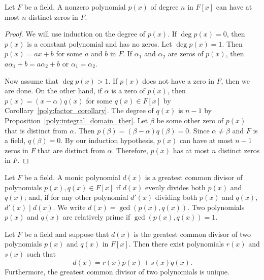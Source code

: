  
\begin{corollary}\label{poly:zeros_corollary}
Let $F$ be a field. A nonzero polynomial $p(x)$ of degree $n$ in
$F[x]$ can have at most $n$ distinct zeros in $F$.  
\end{corollary}
 
 
\begin{proof}
We will use induction on the degree of $p(x)$. If $\deg p(x) = 0$,
then $p(x)$ is a constant polynomial and has no zeros.  Let $\deg p(x)
= 1$. Then $p(x) = ax +b$ for some $a$ and $b$ in $F$. If $\alpha_1$ and
$\alpha_2$ are zeros of $p(x)$, then $a\alpha_1 + b = a\alpha_2 +b$ or
$\alpha_1 = \alpha_2$. 
 
Now assume that $\deg p(x) > 1$. If $p(x)$ does not have a zero in
$F$, then we are done.  On the other hand, if $\alpha$ is a zero of
$p(x)$, then $p(x) = (x - \alpha ) q(x)$ for some $q(x) \in F[x]$ by
Corollary~\ref{poly:factor_corollary}. The degree of $q(x)$ is $n-1$ by Proposition~\ref{poly:integral_domain_ther}.
Let $\beta$ be some other zero of $p(x)$ that is distinct from
$\alpha$. Then $p(\beta) = (\beta - \alpha) q(\beta) = 0$. Since
$\alpha \neq \beta$ and $F$ is a field, $q(\beta ) = 0$. By our
induction hypothesis, $p(x)$ can have at most $n -1$ zeros in $F$ that
are distinct from $\alpha$. Therefore, $p(x)$ has at most $n$ distinct
zeros in $F$.
\end{proof}
 
 
\medskip
 
 
Let $F$ be a field.  A monic polynomial $d(x)$ is a {\bfi greatest
common divisor\/} of polynomials 
$p(x), q(x) \in F[x]$ if $d(x)$ evenly divides both $p(x)$ and $q(x)$;
and, if for any other polynomial $d'(x)$ dividing both $p(x)$ and
$q(x)$,  $d'(x) \mid d(x)$.  We write $d(x) = \gcd( p(x), q( x))$. Two
polynomials $p(x)$ and $q(x)$ are {\bfi relatively prime\/} if $\gcd(
p(x), q(x) ) = 1$. 
 
 
\begin{proposition}\label{poly:gcd_ther}
Let $F$ be a field and suppose that $d(x)$ is the greatest common
divisor of two polynomials $p(x)$ and $q(x)$ in $F[x]$. Then there
exist polynomials $r(x)$ and $s(x)$ such that
\[
d(x) = r(x) p(x) + s(x) q(x).
\]
Furthermore, the greatest common divisor of two polynomials is unique. 
\end{proposition}
 
